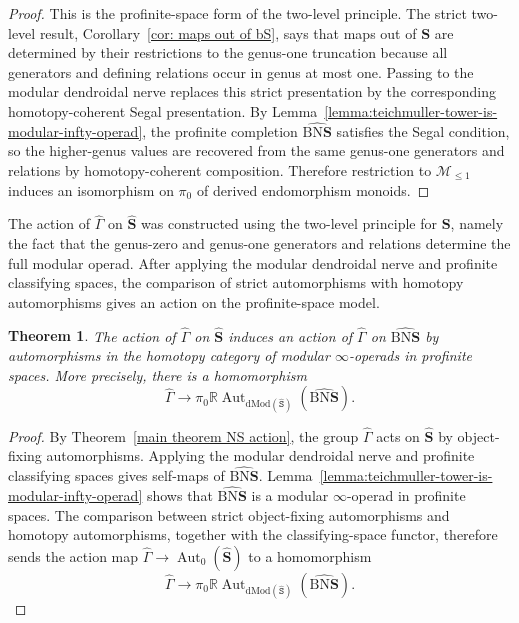 \documentclass{amsart}
\newcommand{\bM}{\mathscr{M}}
\newcommand{\bS}{\mathbf{S}}
\newcommand{\isSet}{\mathtt{S}}
\newcommand{\dMod}{\mathrm{dMod}}
\newcommand{\cs}{\mathrm{B}}
\newcommand{\nerve}{\mathrm{N}}
\newcommand{\Aut}{\operatorname{Aut}}
\newcommand{\NS}{\widehat{\mathsf{\Gamma}}}
\newtheorem{thm}[theorem]{Theorem}%
\theoremstyle{definition}
\numberwithin{equation}{section}
\begin{document}
\begin{proof}
This is the profinite-space form of the two-level principle. The strict two-level result, Corollary~\ref{cor: maps out of bS}, says that maps out of $\bS$ are determined by their restrictions to the genus-one truncation because all generators and defining relations occur in genus at most one. Passing to the modular dendroidal nerve replaces this strict presentation by the corresponding homotopy-coherent Segal presentation. By Lemma~\ref{lemma:teichmuller-tower-is-modular-infty-operad}, the profinite completion $\widehat{\cs\nerve\bS}$ satisfies the Segal condition, so the higher-genus values are recovered from the same genus-one generators and relations by homotopy-coherent composition. Therefore restriction to $\bM_{\leq 1}$ induces an isomorphism on $\pi_0$ of derived endomorphism monoids.
\end{proof}

The action of $\NS$ on $\widehat{\bS}$ was constructed using the two-level principle for $\bS$, namely the fact that the genus-zero and genus-one generators and relations determine the full modular operad. After applying the modular dendroidal nerve and profinite classifying spaces, the comparison of strict automorphisms with homotopy automorphisms gives an action on the profinite-space model.

\begin{thm}\label{NS action on topological operad}
The action of $\NS$ on $\widehat{\bS}$ induces an action of $\NS$ on $\widehat{\cs\nerve\bS}$ by automorphisms in the homotopy category of modular $\infty$-operads in profinite spaces. More precisely, there is a homomorphism
\[
\NS\longrightarrow
\pi_0\mathbb R\Aut_{\dMod(\widehat{\isSet})}
(\widehat{\cs\nerve\bS}).
\]
\end{thm}

\begin{proof}
By Theorem~\ref{main theorem NS action}, the group $\NS$ acts on $\widehat{\bS}$ by object-fixing automorphisms. Applying the modular dendroidal nerve and profinite classifying spaces gives self-maps of $\widehat{\cs\nerve\bS}$. Lemma~\ref{lemma:teichmuller-tower-is-modular-infty-operad} shows that $\widehat{\cs\nerve\bS}$ is a modular $\infty$-operad in profinite spaces. The comparison between strict object-fixing automorphisms and homotopy automorphisms, together with the classifying-space functor, therefore sends the action map $\NS\longrightarrow \Aut_0(\widehat{\bS})$ to a homomorphism
\[
\NS\longrightarrow
\pi_0\mathbb R\Aut_{\dMod(\widehat{\isSet})}
(\widehat{\cs\nerve\bS}).
\]
\end{proof}
\appendix
\end{document}
